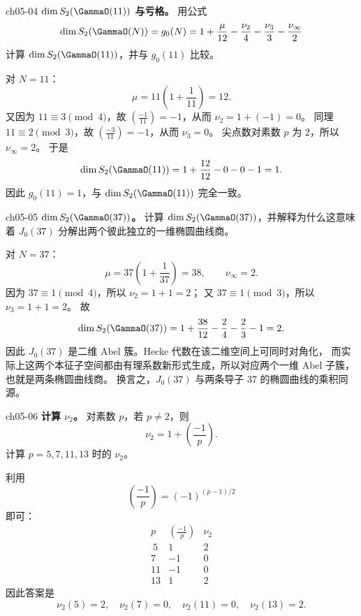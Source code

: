 \begin{problem}{ch05-04}
\textbf{$\dim S_2(\GammaO(11))$ 与亏格。}
用公式
\[
\dim S_2(\GammaO(N))=g_0(N)=1+\frac{\mu}{12}-\frac{\nu_2}{4}-\frac{\nu_3}{3}-\frac{\nu_\infty}{2}
\]
计算 $\dim S_2(\GammaO(11))$，并与 $g_0(11)$ 比较。
\end{problem}
\begin{solution}
对 $N=11$：
\[
\mu=11\left(1+\frac1{11}\right)=12.
\]
又因为 $11\equiv 3\pmod4$，故 $\left(\frac{-1}{11}\right)=-1$，从而 $\nu_2=1+(-1)=0$。
同理 $11\equiv 2\pmod3$，故 $\left(\frac{-3}{11}\right)=-1$，从而 $\nu_3=0$。
尖点数对素数 $p$ 为 $2$，所以 $\nu_\infty=2$。
于是
\[
\dim S_2(\GammaO(11))=1+\frac{12}{12}-0-0-1=1.
\]
因此 $g_0(11)=1$，与 $\dim S_2(\GammaO(11))$ 完全一致。
\end{solution}

\begin{problem}{ch05-05}
\textbf{$\dim S_2(\GammaO(37))$。}
计算 $\dim S_2(\GammaO(37))$，并解释为什么这意味着 $J_0(37)$ 分解出两个彼此独立的一维椭圆曲线商。
\end{problem}
\begin{solution}
对 $N=37$：
\[
\mu=37\left(1+\frac1{37}\right)=38,
\qquad \nu_\infty=2.
\]
因为 $37\equiv 1\pmod4$，所以 $\nu_2=1+1=2$；
又 $37\equiv 1\pmod3$，所以 $\nu_3=1+1=2$。
故
\[
\dim S_2(\GammaO(37))=1+\frac{38}{12}-\frac24-\frac23-1=2.
\]
因此 $J_0(37)$ 是二维 Abel 簇。Hecke 代数在该二维空间上可同时对角化，
而实际上这两个本征子空间都由有理系数新形式生成，所以对应两个一维 Abel 子簇，也就是两条椭圆曲线商。
换言之，$J_0(37)$ 与两条导子 $37$ 的椭圆曲线的乘积同源。
\end{solution}

\begin{problem}{ch05-06}
\textbf{计算 $\nu_2$。}
对素数 $p$，若 $p\neq 2$，则
\[
\nu_2=1+\left(\frac{-1}{p}\right).
\]
计算 $p=5,7,11,13$ 时的 $\nu_2$。
\end{problem}
\begin{solution}
利用
\[
\left(\frac{-1}{p}\right)=(-1)^{(p-1)/2}
\]
即可：
\[
\begin{array}{c|c|c}
p & \left(\frac{-1}{p}\right) & \nu_2 \\\ \hline
5 & 1 & 2 \\
7 & -1 & 0 \\
11 & -1 & 0 \\
13 & 1 & 2
\end{array}
\]
因此答案是
\[
\nu_2(5)=2,\quad \nu_2(7)=0,\quad \nu_2(11)=0,\quad \nu_2(13)=2.
\]
\end{solution}

